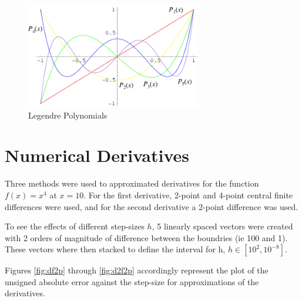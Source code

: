 \documentclass[twocolumn]{article}
\begin{document}
\begin{figure}[h]
  \centering
  \includegraphics[scale = 0.4]{pwolfram}
  \caption{Legendre Polynomials \cite{weissteinP}}
  \label{fig:pwolf}
\end{figure}

\vfill\eject
\section{Numerical Derivatives}

Three methods were used to approximated derivatives for the function $f(x) = x^4$ at $x=10$. For the first derivative, 2-point and 4-point central finite
differences were used, and for the second derivative a 2-point difference was used.

To see the effects of different step-sizes $h$, 5 linearly spaced vectors were created with 2 orders of magnitude of difference between the boundries (ie 100 and 1). These
vectors where then stacked to define the interval for h, $h\in[10^2,10^{-8}]$.

Figures \ref{fig:df2p} through \ref{fig:d2f2p} accordingly represent the plot of the unsigned absolute error against the step-size for approximations of the derivatives.
\end{document}

